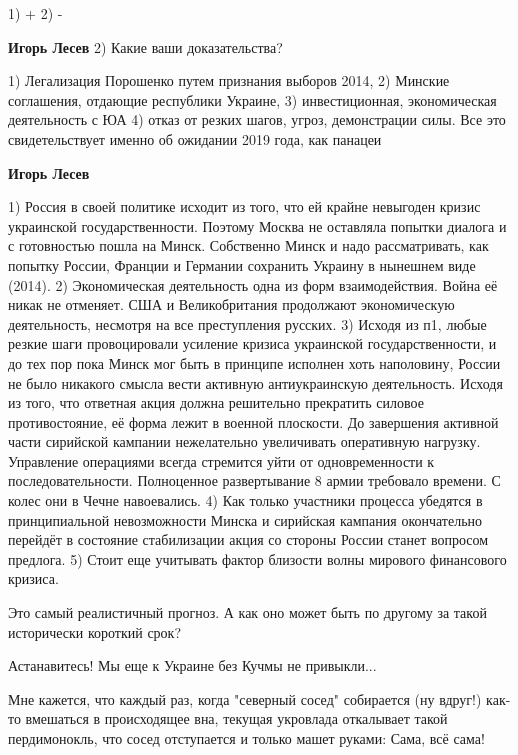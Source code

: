 \begin{itemize}
\begin{itemize} %
1) + 2) -

\textbf{Игорь Лесев} 2) Какие ваши доказательства?

1) Легализация Порошенко путем признания выборов 2014, 2) Минские соглашения, отдающие республики Украине, 3) инвестиционная, экономическая деятельность с ЮА 4) отказ от резких шагов, угроз, демонстрации силы. Все это свидетельствует именно об ожидании 2019 года, как панацеи

\textbf{Игорь Лесев} 

1) Россия в своей политике исходит из того, что ей крайне невыгоден кризис
украинской государственности. Поэтому Москва не оставляла попытки диалога и с
готовностью пошла на Минск. Собственно Минск и надо рассматривать, как попытку
России, Франции и Германии сохранить Украину в нынешнем виде (2014). 2)
Экономическая деятельность одна из форм взаимодействия. Война её никак не
отменяет. США и Великобритания продолжают экономическую деятельность, несмотря
на все преступления русских. 3) Исходя из п1, любые резкие шаги провоцировали
усиление кризиса украинской государственности, и до тех пор пока Минск мог быть
в принципе исполнен хоть наполовину, России не было никакого смысла вести
активную антиукраинскую деятельность. Исходя из того, что ответная акция должна
решительно прекратить силовое противостояние, её форма лежит в военной
плоскости. До завершения активной части сирийской кампании нежелательно
увеличивать оперативную нагрузку. Управление операциями всегда стремится уйти
от одновременности к последовательности. Полноценное развертывание 8 армии
требовало времени. С колес они в Чечне навоевались. 4) Как только участники
процесса убедятся в принципиальной невозможности Минска и сирийская кампания
окончательно перейдёт в состояние стабилизации акция со стороны России станет
вопросом предлога. 5) Стоит еще учитывать фактор близости волны мирового
финансового кризиса.

\end{itemize} %

Это самый реалистичный прогноз. А как оно может быть по другому за такой исторически короткий срок?

Астанавитесь! Мы еще к Украине без Кучмы не привыкли...


Мне кажется, что каждый раз, когда "северный сосед" собирается (ну вдруг!)
как-то вмешаться в происходящее вна, текущая укровлада откалывает такой
пердимонокль, что сосед отступается и только машет руками: Сама, всё сама!


\end{itemize}
